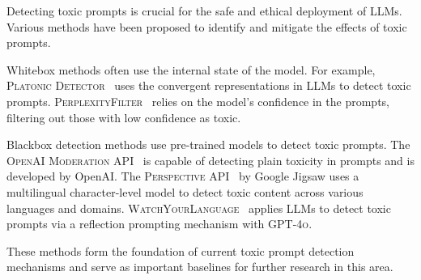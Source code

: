 Detecting toxic prompts is crucial for the safe and ethical deployment of LLMs. Various methods have been proposed to identify and mitigate the effects of toxic prompts. 

Whitebox methods often use the internal state of the model. For example, \textsc{Platonic Detector}~\cite{huh2024platonic} uses the convergent representations in LLMs to detect toxic prompts. \textsc{PerplexityFilter}~\cite{jain2023baseline} relies on the model's confidence in the prompts, filtering out those with low confidence as toxic.

Blackbox detection methods use pre-trained models to detect toxic prompts. The \textsc{OpenAI Moderation API}~\cite{openai2022moderation} is capable of detecting plain toxicity in prompts and is developed by OpenAI. The \textsc{Perspective API}~\cite{lees2022new} by Google Jigsaw uses a multilingual character-level model to detect toxic content across various languages and domains. \textsc{WatchYourLanguage}~\cite{kumar2024watch} applies LLMs to detect toxic prompts via a reflection prompting mechanism with \textsc{GPT-4o}.

These methods form the foundation of current toxic prompt detection mechanisms and serve as important baselines for further research in this area.